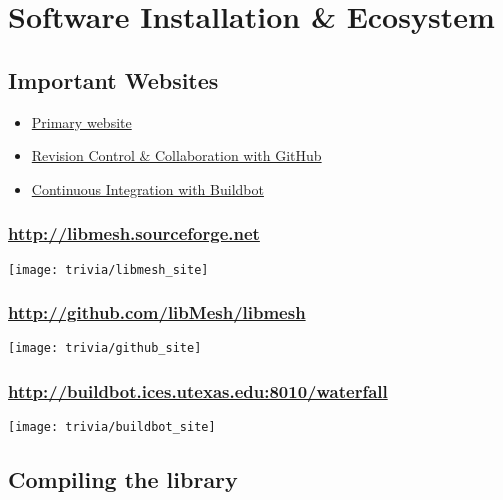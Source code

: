 \section{Software Installation \& Ecosystem}
\subsection{Important Websites}
\frame
{
  \Large
  \begin{block}{}
    \begin{itemize}
      \item \href{http://libmesh.sourceforge.net}{Primary website}
      \item \href{http://github.com/libMesh/libmesh}{Revision Control \& Collaboration with GitHub}
      \item \href{http://buildbot.ices.utexas.edu:8010/waterfall}{Continuous Integration with Buildbot}
    \end{itemize}
  \end{block}
}


\frame
{
\frametitle{\url{http://libmesh.sourceforge.net}}

\centerline{\texttt{[image: trivia/libmesh\_site]}}
}


\frame
{
\frametitle{\url{http://github.com/libMesh/libmesh}}

\centerline{\texttt{[image: trivia/github\_site]}}
}


\frame
{
\frametitle{\scriptsize \url{http://buildbot.ices.utexas.edu:8010/waterfall}}

\centerline{\texttt{[image: trivia/buildbot\_site]}}
}



\subsection{Compiling the library}
\frame
{
  \Large
  \begin{block}{}
  \end{block}
}


